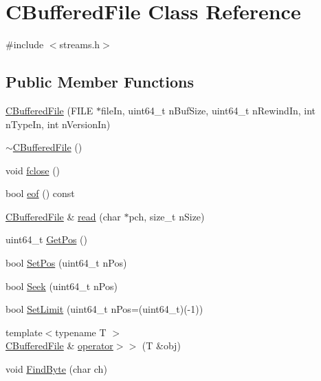 \hypertarget{class_c_buffered_file}{}\section{C\+Buffered\+File Class Reference}
\label{class_c_buffered_file}


{\ttfamily \#include $<$streams.\+h$>$}

\subsection*{Public Member Functions}
\begin{DoxyCompactItemize}
\item 
\mbox{\hyperlink{class_c_buffered_file_a30ad96a8d09bed60355d1fadda7dabdc}{C\+Buffered\+File}} (F\+I\+LE $\ast$file\+In, uint64\+\_\+t n\+Buf\+Size, uint64\+\_\+t n\+Rewind\+In, int n\+Type\+In, int n\+Version\+In)
\item 
\mbox{\hyperlink{class_c_buffered_file_a8804f689b27d3298cd5d63fbcddb97d1}{$\sim$\+C\+Buffered\+File}} ()
\item 
void \mbox{\hyperlink{class_c_buffered_file_aef8c993fe3eb0fa423d09d095f40dcf6}{fclose}} ()
\item 
bool \mbox{\hyperlink{class_c_buffered_file_af0ff112a5fd46ba3e8f2f1f4f36d5566}{eof}} () const
\item 
\mbox{\hyperlink{class_c_buffered_file}{C\+Buffered\+File}} \& \mbox{\hyperlink{class_c_buffered_file_a20c6d2a4dbc69a8e5c7ba766d04b3d85}{read}} (char $\ast$pch, size\+\_\+t n\+Size)
\item 
uint64\+\_\+t \mbox{\hyperlink{class_c_buffered_file_af9e7226e682ede9c1c141fb2972afd7b}{Get\+Pos}} ()
\item 
bool \mbox{\hyperlink{class_c_buffered_file_aac4029a9aade127cc8a1fbbcc1549599}{Set\+Pos}} (uint64\+\_\+t n\+Pos)
\item 
bool \mbox{\hyperlink{class_c_buffered_file_afbf9abcc70f24824661aec96a4310a63}{Seek}} (uint64\+\_\+t n\+Pos)
\item 
bool \mbox{\hyperlink{class_c_buffered_file_adfcf370a41be0454e0f6b3dc358e415c}{Set\+Limit}} (uint64\+\_\+t n\+Pos=(uint64\+\_\+t)(-\/1))
\item 
{\footnotesize template$<$typename T $>$ }\\\mbox{\hyperlink{class_c_buffered_file}{C\+Buffered\+File}} \& \mbox{\hyperlink{class_c_buffered_file_ab570d5f1a173a41100e7b42b4aacbbc5}{operator$>$$>$}} (T \&obj)
\item 
void \mbox{\hyperlink{class_c_buffered_file_a15ce0683ba5925939d33f098a948236b}{Find\+Byte}} (char ch)
\end{DoxyCompactItemize}

